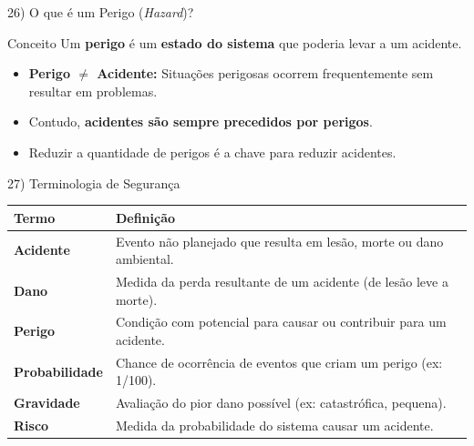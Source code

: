 \documentclass[aspectratio=169]{beamer}
\begin{document}
\begin{frame}{26) O que é um Perigo (\textit{Hazard})?}
  \begin{block}{Conceito}
    Um \textbf{perigo} é um \textbf{estado do sistema} que poderia levar a um acidente.
  \end{block}
  \vspace{0.5em}
  \begin{itemize}
    \item \textbf{Perigo $\neq$ Acidente:} Situações perigosas ocorrem frequentemente sem resultar em problemas.
    \item Contudo, \textbf{acidentes são sempre precedidos por perigos}.
    \item \alert{Reduzir a quantidade de perigos é a chave para reduzir acidentes.}
  \end{itemize}
  \vspace{0.3em}
  \centering
\end{frame}

\begin{frame}{27) Terminologia de Segurança}
  \centering
  \small
  \begin{tabular}{|l|p{9cm}|}
    \hline
    \textbf{Termo} & \textbf{Definição} \\ \hline
    \textbf{Acidente} & Evento não planejado que resulta em lesão, morte ou dano ambiental. \\ \hline
    \textbf{Dano} & Medida da perda resultante de um acidente (de lesão leve a morte). \\ \hline
    \textbf{Perigo} & Condição com potencial para causar ou contribuir para um acidente. \\ \hline
    \textbf{Probabilidade} & Chance de ocorrência de eventos que criam um perigo (ex: 1/100). \\ \hline
    \textbf{Gravidade} & Avaliação do pior dano possível (ex: catastrófica, pequena). \\ \hline
    \textbf{Risco} & Medida da probabilidade do sistema causar um acidente. \\ \hline
  \end{tabular}
\end{frame}
\end{document}
